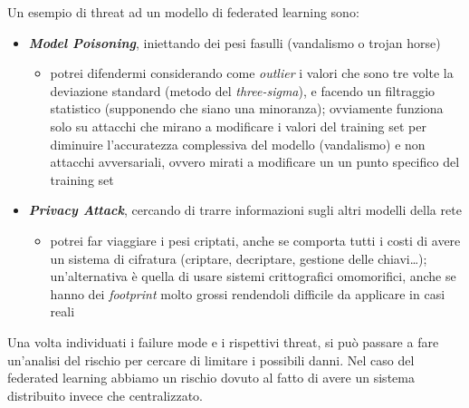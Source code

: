 \documentclass{report}
\begin{document}
\noindent Un esempio di threat ad un modello di federated learning sono:
\begin{itemize}
    \item \textbf{\textit{Model Poisoning}}, iniettando dei pesi fasulli (vandalismo o trojan horse)
    \begin{itemize}
        \item potrei difendermi considerando come \textit{outlier} i valori che sono tre volte la deviazione standard (metodo del \textit{three-sigma}), 
        e facendo un filtraggio statistico (supponendo che siano una minoranza); ovviamente funziona solo su attacchi che mirano a modificare i valori 
        del training set per diminuire l'accuratezza complessiva del modello (vandalismo) e non attacchi avversariali, ovvero mirati a modificare un 
        un punto specifico del training set 
    \end{itemize}
    \item \textbf{\textit{Privacy Attack}}, cercando di trarre informazioni sugli altri modelli della rete
    \begin{itemize}
        \item potrei far viaggiare i pesi criptati, anche se comporta tutti i costi di avere un sistema di cifratura (criptare, decriptare, 
        gestione delle chiavi\dots); un'alternativa è quella di usare sistemi crittografici omomorifici, anche se hanno dei \textit{footprint}
        molto grossi rendendoli difficile da applicare in casi reali
    \end{itemize}
\end{itemize}

\noindent Una volta individuati i failure mode e i rispettivi threat, si può passare a fare un'analisi del rischio per cercare di limitare i possibili 
danni. Nel caso del federated learning abbiamo un rischio dovuto al fatto di avere un sistema distribuito invece che centralizzato.
\end{document}
